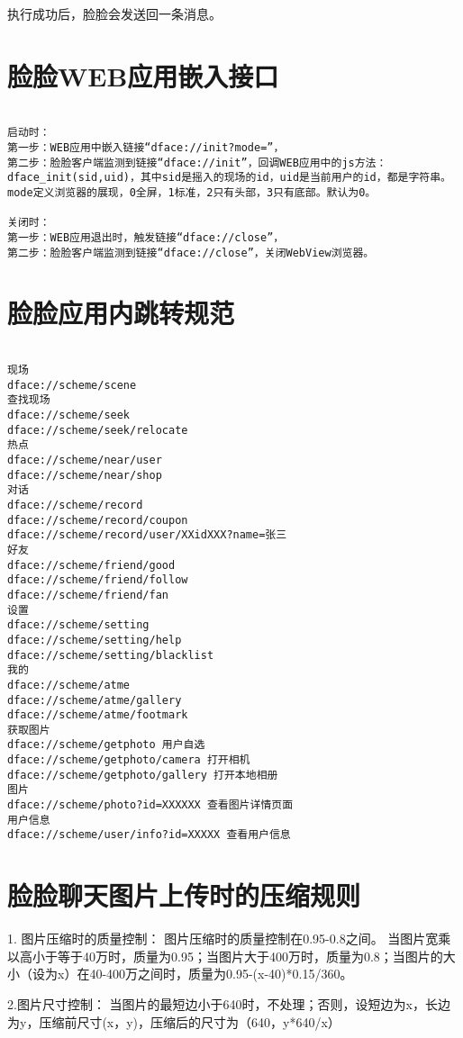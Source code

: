 \documentclass[cs4size]{ctexartutf8}
\begin{document}
执行成功后，脸脸会发送回一条消息。

\section{脸脸WEB应用嵌入接口}
\begin{verbatim}

启动时：
第一步：WEB应用中嵌入链接“dface://init?mode=”，
第二步：脸脸客户端监测到链接“dface://init”，回调WEB应用中的js方法：dface_init(sid,uid)，其中sid是摇入的现场的id，uid是当前用户的id，都是字符串。mode定义浏览器的展现，0全屏，1标准，2只有头部，3只有底部。默认为0。

关闭时：
第一步：WEB应用退出时，触发链接“dface://close”，
第二步：脸脸客户端监测到链接“dface://close”，关闭WebView浏览器。
\end{verbatim}


\section{脸脸应用内跳转规范}
\begin{verbatim}

现场
dface://scheme/scene
查找现场
dface://scheme/seek
dface://scheme/seek/relocate
热点
dface://scheme/near/user
dface://scheme/near/shop
对话
dface://scheme/record
dface://scheme/record/coupon
dface://scheme/record/user/XXidXXX?name=张三
好友
dface://scheme/friend/good
dface://scheme/friend/follow
dface://scheme/friend/fan
设置
dface://scheme/setting
dface://scheme/setting/help
dface://scheme/setting/blacklist
我的
dface://scheme/atme
dface://scheme/atme/gallery
dface://scheme/atme/footmark
获取图片
dface://scheme/getphoto 用户自选
dface://scheme/getphoto/camera 打开相机
dface://scheme/getphoto/gallery 打开本地相册
图片
dface://scheme/photo?id=XXXXXX 查看图片详情页面
用户信息
dface://scheme/user/info?id=XXXXX 查看用户信息
\end{verbatim}


\section{脸脸聊天图片上传时的压缩规则}

1. 图片压缩时的质量控制：
图片压缩时的质量控制在0.95-0.8之间。
当图片宽乘以高小于等于40万时，质量为0.95；当图片大于400万时，质量为0.8；当图片的大小（设为x）在40-400万之间时，质量为0.95-(x-40)*0.15/360。

2.图片尺寸控制：
当图片的最短边小于640时，不处理；否则，设短边为x，长边为y，压缩前尺寸(x，y)，压缩后的尺寸为（640，y*640/x）
\end{document}

